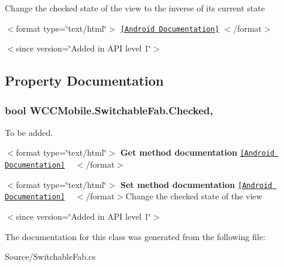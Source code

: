 Change the checked state of the view to the inverse of its current state 

$<$format type=\char`\"{}text/html\char`\"{}$>$ \href{http://developer.android.com/reference/android/widget/Checkable.html#toggle()}{\tt \mbox{[}Android Documentation\mbox{]}} $<$/format$>$ 

$<$since version=\char`\"{}\+Added in A\+P\+I level 1\char`\"{}$>$ 

\subsection{Property Documentation}
\subsubsection[{\texorpdfstring{Checked}{Checked}}]{\setlength{\rightskip}{0pt plus 5cm}bool W\+C\+C\+Mobile.\+Switchable\+Fab.\+Checked\hspace{0.3cm}{\ttfamily [get]}, {\ttfamily [set]}}\hypertarget{class_w_c_c_mobile_1_1_switchable_fab_a5e47f1f153ff63519425d35f0d4515d7}{}\label{class_w_c_c_mobile_1_1_switchable_fab_a5e47f1f153ff63519425d35f0d4515d7}




To be added. 

$<$format type=\char`\"{}text/html\char`\"{}$>$ {\bfseries Get method documentation} \href{http://developer.android.com/reference/android/widget/Checkable.html#isChecked()}{\tt \mbox{[}Android Documentation\mbox{]}} ~\newline
 $<$/format$>$ 

$<$format type=\char`\"{}text/html\char`\"{}$>$ {\bfseries Set method documentation} \href{http://developer.android.com/reference/android/widget/Checkable.html#setChecked(boolean)}{\tt \mbox{[}Android Documentation\mbox{]}} ~\newline
 $<$/format$>$Change the checked state of the view

$<$since version=\char`\"{}\+Added in A\+P\+I level 1\char`\"{}$>$ 

The documentation for this class was generated from the following file\+:\begin{DoxyCompactItemize}
\item 
Source/Switchable\+Fab.\+cs\end{DoxyCompactItemize}

